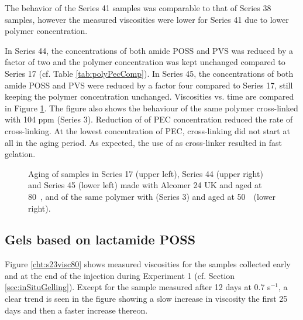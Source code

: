 The behavior of the Series 41 samples was comparable to that of Series 38 samples, however the measured viscosities were lower for Series 41 due to lower polymer concentration.

In Series 44, the concentrations of both amide POSS and PVS was reduced by a factor of two and the polymer concentration was kept unchanged compared to Series 17 (cf. Table \ref{tab:polyPecComp}). In Series 45, the concentrations of both amide POSS and PVS were reduced by a factor four compared to Series 17, still keeping the polymer concentration unchanged. Viscosities vs. time are compared in Figure \ref{cht:s44visc80}. The figure also shows the behaviour of the same polymer cross-linked with 104 ppm  (Series 3). Reduction of of PEC concentration reduced the rate of cross-linking. At the lowest concentration of PEC, cross-linking did not start at all in the aging period. As expected, the use of  as cross-linker resulted in fast gelation.

\begin{figure}
    \centering
    \caption{Aging of samples in Series 17 (upper left), Series 44 (upper right) and Series 45 (lower left) made with Alcomer 24 UK and aged at 80~\celsius, and of the same polymer with  (Series 3) and aged at 50~\celsius~(lower right).}
    \label{cht:s44visc80}
\end{figure}

\subsection{Gels based on lactamide POSS}
Figure \ref{cht:s23visc80} shows measured viscosities for the samples collected early and at the end of the injection during Experiment 1 (cf. Section \ref{sec:inSituGelling}). Except for the sample measured after 12 days at 0.7 s$^{-1}$, a clear trend is seen in the figure showing a slow increase in viscosity the first 25 days and then a faster increase thereon.

